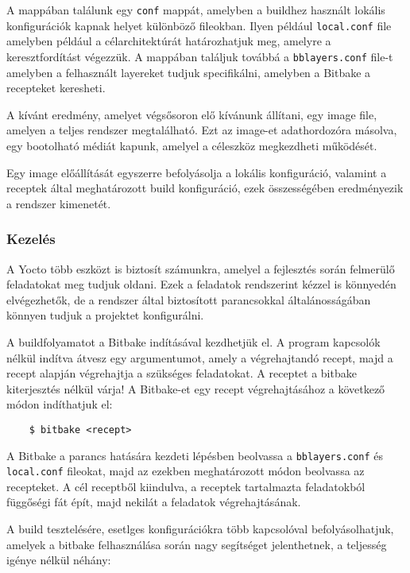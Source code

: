 A mappában találunk egy \verb|conf| mappát, amelyben a buildhez használt lokális
konfigurációk kapnak helyet különböző fileokban. Ilyen például \verb|local.conf|
file amelyben például a célarchitektúrát határozhatjuk meg, amelyre a
keresztfordítást végezzük. A mappában találjuk továbbá a \verb|bblayers.conf|
file-t amelyben a felhasznált layereket tudjuk specifikálni, amelyben a Bitbake a
recepteket keresheti.

\medskip

A kívánt eredmény, amelyet végsősoron elő kívánunk állítani, egy image file,
amelyen a teljes rendszer megtalálható. Ezt az image-et adathordozóra másolva,
egy bootolható médiát kapunk, amelyel a céleszköz megkezdheti működését. 

Egy image előállítását egyszerre befolyásolja a lokális konfiguráció, valamint a
receptek által meghatározott build konfiguráció, ezek összességében eredményezik
a rendszer kimenetét. 

\subsubsection{Kezelés}

A Yocto több eszközt is biztosít számunkra, amelyel a fejlesztés során felmerülő
feladatokat meg tudjuk oldani. Ezek a feladatok rendszerint kézzel is könnyedén
elvégezhetők, de a rendszer által biztosított parancsokkal általánosságában
könnyen tudjuk a projektet konfigurálni.

\medskip

A buildfolyamatot a Bitbake indításával kezdhetjük el. A program kapcsolók nélkül
indítva átvesz egy argumentumot, amely a végrehajtandó recept, majd a recept
alapján végrehajtja a szükséges feladatokat. A receptet a bitbake kiterjesztés
nélkül várja! A Bitbake-et egy recept végrehajtásához a következő módon
indíthatjuk el:

\begin{verbatim}
    $ bitbake <recept>
\end{verbatim}

A Bitbake a parancs hatására kezdeti lépésben beolvassa a \verb|bblayers.conf| és
\verb|local.conf| fileokat, majd az ezekben meghatározott módon beolvassa az
recepteket. A cél receptből kiindulva, a receptek tartalmazta feladatokból
függőségi fát épít, majd nekilát a feladatok végrehajtásának.

A build tesztelésére, esetlges konfigurációkra több kapcsolóval befolyásolhatjuk,
amelyek a bitbake felhasználása során nagy segítséget jelenthetnek, a teljesség
igénye nélkül néhány:

